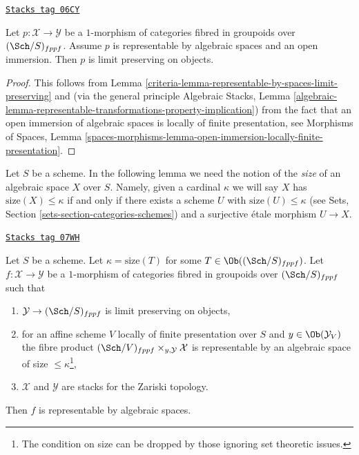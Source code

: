 \begin{lemma}
\label{criteria-lemma-open-immersion-limit-preserving}
\href{https://stacks.math.columbia.edu/tag/06CY}{\texttt{Stacks tag 06CY}}

Let $p : \mathcal{X} \to \mathcal{Y}$ be a $1$-morphism of categories
fibred in groupoids over $(\Sch/S)_{fppf}$. Assume $p$ is representable
by algebraic spaces and an open immersion. Then $p$ is limit preserving
on objects.
\end{lemma}

\begin{proof}

This follows from
Lemma \ref{criteria-lemma-representable-by-spaces-limit-preserving}
and (via the general principle
Algebraic Stacks, Lemma
\ref{algebraic-lemma-representable-transformations-property-implication})
from the fact that an open immersion of algebraic spaces is
locally of finite presentation, see
Morphisms of Spaces, Lemma
\ref{spaces-morphisms-lemma-open-immersion-locally-finite-presentation}.
\end{proof}

Let $S$ be a scheme. In the following lemma we need the notion of the
{\it size} of an algebraic space $X$ over $S$. Namely, given a cardinal
$\kappa$ we will say $X$ has $\text{size}(X) \leq \kappa$ if and only
if there exists a scheme $U$ with $\text{size}(U) \leq \kappa$ (see
Sets, Section \ref{sets-section-categories-schemes}) and a surjective
\'etale morphism $U \to X$.

\begin{lemma}
\label{criteria-lemma-check-representable-limit-preserving}
\href{https://stacks.math.columbia.edu/tag/07WH}{\texttt{Stacks tag 07WH}}

Let $S$ be a scheme.
Let $\kappa = \text{size}(T)$ for some $T \in \Ob((\Sch/S)_{fppf})$.
Let $f : \mathcal{X} \to \mathcal{Y}$ be a $1$-morphism
of categories fibred in groupoids over $(\Sch/S)_{fppf}$
such that
\begin{enumerate}
\item $\mathcal{Y} \to (\Sch/S)_{fppf}$ is limit preserving on objects,
\item for an affine scheme $V$ locally of finite presentation over $S$ and
$y \in \Ob(\mathcal{Y}_V)$ the fibre product
$(\Sch/V)_{fppf} \times_{y, \mathcal{Y}} \mathcal{X}$ is representable
by an algebraic space of size $\leq \kappa$\footnote{The condition on
size can be dropped by those ignoring set theoretic issues.},
\item $\mathcal{X}$ and $\mathcal{Y}$ are stacks for the Zariski topology.
\end{enumerate}
Then $f$ is representable by algebraic spaces.
\end{lemma}

